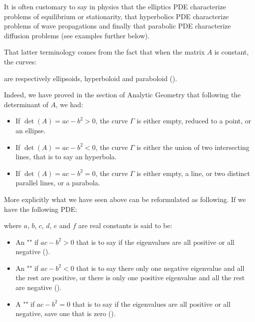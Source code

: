 	It is often customary to say in physics that the elliptics PDE characterize problems of equilibrium or stationarity, that hyperbolics PDE characterize problems of wave propagations and finally that parabolic PDE characterize diffusion problems (see examples further below).
	
	That latter terminology comes from the fact that when the matrix $A$ is constant, the curves:
	 
	are respectively ellipsoids, hyperboloid and paraboloid ().

	Indeed, we have proved in the section of Analytic Geometry that following the determinant of $A$, we had:
	\begin{itemize}
		\item If $\det(A)=ac-b^2>0$, the curve $\Gamma$ is either empty, reduced to a point, or an ellipse.

		\item If $\det(A)=ac-b^2<0$, the curve $\Gamma$ is either the union of two intersecting lines, that is to say an hyperbola.

		\item If $\det(A)=ac-b^2=0$, the curve $\Gamma$ is either empty, a line, or two distinct parallel lines, or a parabola.	
	\end{itemize}
	More explicitly what we have seen above can be reformulated as following. If we have the following PDE:
	
	where $a$, $b$, $c$, $d$, $e$ and $f$ are real constants is said to be:
	\begin{itemize}
		\item An "" if $ac-b^2>0$ that is to say if the eigenvalues are all positive or all negative ().

		\item An "" if $ac-b^2<0$ that is to say there only one negative eigenvalue and all the rest are positive, or there is only one positive eigenvalue and all the rest are negative ().

		\item A "\label{parabolic partial differential equation}" if $ac-b^2=0$ that is to say if the eigenvalues are all positive or all negative, save one that is zero ().
	\end{itemize}

